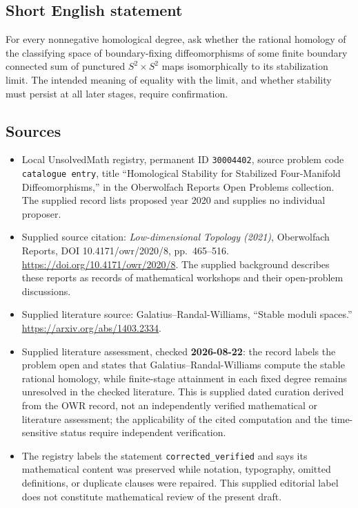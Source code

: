 \documentclass[11pt]{article}
\begin{document}
\subsection{Short English statement}
For every nonnegative homological degree, ask whether the rational homology of the classifying space of boundary-fixing diffeomorphisms of some finite boundary connected sum of punctured \(S^2\times S^2\) maps isomorphically to its stabilization limit. The intended meaning of equality with the limit, and whether stability must persist at all later stages, require confirmation.
\subsection{Sources}
\begin{itemize}
\item Local UnsolvedMath registry, permanent ID \texttt{30004402}, source problem code \texttt{catalogue entry}, title ``Homological Stability for Stabilized Four-Manifold Diffeomorphisms,'' in the Oberwolfach Reports Open Problems collection. The supplied record lists proposed year 2020 and supplies no individual proposer.
\item Supplied source citation: \emph{Low-dimensional Topology (2021)}, Oberwolfach Reports, DOI 10.4171/owr/2020/8, pp.\ 465--516. \url{https://doi.org/10.4171/owr/2020/8}. The supplied background describes these reports as records of mathematical workshops and their open-problem discussions.
\item Supplied literature source: Galatius--Randal-Williams, ``Stable moduli spaces.'' \url{https://arxiv.org/abs/1403.2334}.
\item Supplied literature assessment, checked \textbf{2026-08-22}: the record labels the problem open and states that Galatius--Randal-Williams compute the stable rational homology, while finite-stage attainment in each fixed degree remains unresolved in the checked literature. This is supplied dated curation derived from the OWR record, not an independently verified mathematical or literature assessment; the applicability of the cited computation and the time-sensitive status require independent verification.
\item The registry labels the statement \texttt{corrected\_verified} and says its mathematical content was preserved while notation, typography, omitted definitions, or duplicate clauses were repaired. This supplied editorial label does not constitute mathematical review of the present draft.
\end{itemize}
\end{document}

